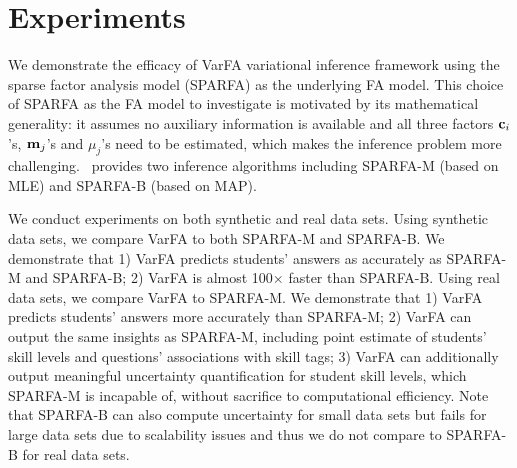 \documentclass{edm_article}
\newcommand{\ml}[1]{\textcolor{orange}{\bf [LAN bandit: #1]}}
\newcommand{\jack}[1]{\textcolor{purple}{\bf [jack the ripper: #1]}}
\begin{document}

\section{Experiments}
\label{sec:experiments}
We demonstrate the efficacy of VarFA variational inference framework using the sparse factor analysis model (SPARFA) as the underlying FA model. 
This choice of SPARFA as the FA model to investigate is motivated by its mathematical generality: it assumes no auxiliary information is available and all three factors ${\mathbf{c}}_i$'s, ${\mathbf{m}}_j$'s and $\mu_j$'s need to be estimated, which makes the inference problem more challenging.~\cite{lan14a} provides two inference algorithms including SPARFA-M (based on MLE) and SPARFA-B (based on MAP). 

We conduct experiments on both synthetic and real data sets. Using synthetic data sets, we compare VarFA to both SPARFA-M and SPARFA-B. We demonstrate that 1) VarFA predicts students' answers as accurately as SPARFA-M and SPARFA-B; 2) VarFA is almost 100$\times$ faster than SPARFA-B. Using real data sets, we compare VarFA to SPARFA-M. We demonstrate that 1) VarFA predicts students' answers more accurately than SPARFA-M; 2) VarFA can output the same insights as SPARFA-M, including point estimate of students' skill levels and questions' associations with skill tags; 
3) VarFA can additionally output meaningful uncertainty quantification for student skill levels, which SPARFA-M is incapable of, without sacrifice to computational efficiency. Note that SPARFA-B can also compute uncertainty for small data sets but fails for large data sets due to scalability issues and thus we do not compare to SPARFA-B for real data sets.
\end{document}
